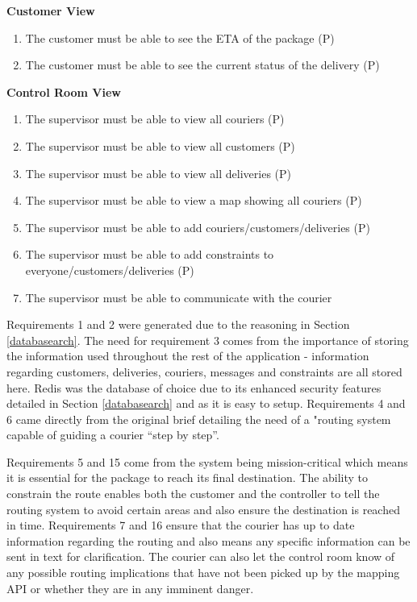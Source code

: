 \textbf{Customer View}
\begin{enumerate}[resume]
\item The customer must be able to see the ETA of the package (P)
\item The customer must be able to see the current status of the delivery (P)
\end{enumerate}

\textbf{Control Room View}
\begin{enumerate}[resume]

\item The supervisor must be able to view all couriers (P)
\item The supervisor must be able to view all customers (P)
\item The supervisor must be able to view all deliveries (P)
\item The supervisor must be able to view a map showing all couriers (P)
\item The supervisor must be able to add couriers/customers/deliveries (P)
\item The supervisor must be able to add constraints to everyone/customers/deliveries (P)
\item The supervisor must be able to communicate with the courier

\end{enumerate}

Requirements 1 and 2 were generated due to the reasoning in Section \ref{databasearch}. The need for requirement 3 comes from the importance of storing the information used throughout the rest of the application - information regarding customers, deliveries, couriers, messages and constraints are all stored here. Redis was the database of choice due to its enhanced security features detailed in Section \ref{databasearch} and as it is easy to setup. Requirements 4 and 6 came directly from the original brief detailing the need of a "routing system capable of guiding a courier “step by step”. 

Requirements 5 and 15 come from the system being mission-critical which means it is essential for the package to reach its final destination. The ability to constrain the route enables both the customer and the controller to tell the routing system to avoid certain areas and also ensure the destination is reached in time. Requirements 7 and 16 ensure that the courier has up to date information regarding the routing and also means any specific information can be sent in text for clarification. The courier can also let the control room know of any possible routing implications that have not been picked up by the mapping API or whether they are in any imminent danger. 

